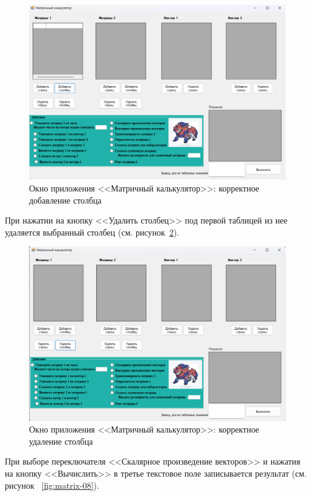 \documentclass[bachelor, och, pract, times]{SCWorks}
\begin{document}
\begin{figure}[H]
    \centering
    \includegraphics[scale=0.4]{Скрины/Снимок экрана 2025-01-05 131707.png}
    \caption{Окно приложения <<Матричный калькулятор>>: корректное добавление столбца}\label{fig:matrix-03}
\end{figure}

При нажатии на кнопку <<Удалить столбец>> под первой таблицей из нее удаляется выбранный столбец (см. рисунок~\ref{fig:matrix-04}).

\begin{figure}[H]
    \centering
    \includegraphics[scale=0.4]{Скрины/Снимок экрана 2025-01-05 131744.png}
    \caption{Окно приложения <<Матричный калькулятор>>: корректное удаление столбца}\label{fig:matrix-04}
\end{figure}


При выборе переключателя <<Скалярное произведение векторов>> и нажатия на кнопку <<Вычислить>> в третье текстовое поле записывается результат (см. рисунок ~\ref{fig:matrix-08}).
\end{document}
